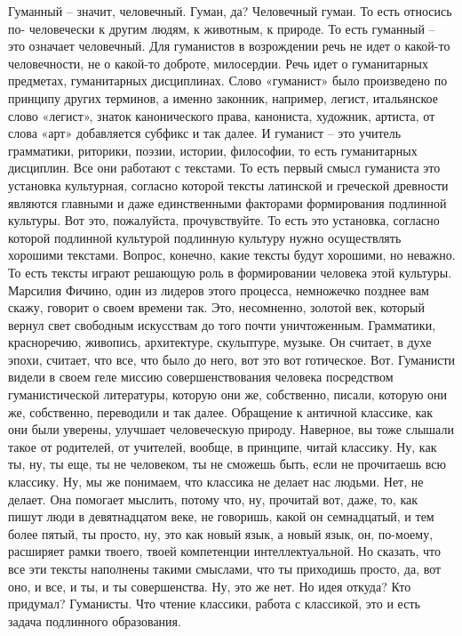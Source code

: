 Гуманный – значит, человечный. Гуман, да? Человечный гуман. То есть относись по-
человечески к другим людям, к животным, к природе. То есть гуманный – это
означает человечный. Для гуманистов в возрождении речь не идет о какой-то
человечности, не о какой-то доброте, милосердии. Речь идет о гуманитарных
предметах, гуманитарных дисциплинах. Слово «гуманист» было произведено по
принципу других терминов, а именно законник, например, легист, итальянское слово
«легист», знаток канонического права, канониста, художник, артиста, от слова
«арт» добавляется субфикс и так далее. И гуманист – это учитель грамматики,
риторики, поэзии, истории, философии, то есть гуманитарных дисциплин. Все они
работают с текстами. То есть первый смысл гуманиста это установка культурная,
согласно которой тексты латинской и греческой древности являются главными и даже
единственными факторами формирования подлинной культуры. Вот это, пожалуйста,
прочувствуйте. То есть это установка, согласно которой подлинной культурой
подлинную культуру нужно осуществлять хорошими текстами. Вопрос, конечно, какие
тексты будут хорошими, но неважно. То есть тексты играют решающую роль в
формировании человека этой культуры. Марсилия Фичино, один из лидеров этого
процесса, немножечко позднее вам скажу, говорит о своем времени так. Это,
несомненно, золотой век, который вернул свет свободным искусствам до того почти
уничтоженным. Грамматики, красноречию, живопись, архитектуре, скульптуре,
музыке. Он считает, в духе эпохи, считает, что все, что было до него, вот это
вот готическое. Вот. Гуманисти видели в своем геле миссию совершенствования
человека посредством гуманистической литературы, которую они же, собственно,
писали, которую они же, собственно, переводили и так далее. Обращение к античной
классике, как они были уверены, улучшает человеческую природу. Наверное, вы тоже
слышали такое от родителей, от учителей, вообще, в принципе, читай классику. Ну,
как ты, ну, ты еще, ты не человеком, ты не сможешь быть, если не прочитаешь всю
классику. Ну, мы же понимаем, что классика не делает нас людьми. Нет, не делает.
Она помогает мыслить, потому что, ну, прочитай вот, даже, то, как пишут люди в
девятнадцатом веке, не говоришь, какой он семнадцатый, и тем более пятый, ты
просто, ну, это как новый язык, а новый язык, он, по-моему, расширяет рамки
твоего, твоей компетенции интеллектуальной. Но сказать, что все эти тексты
наполнены такими смыслами, что ты приходишь просто, да, вот оно, и все, и ты, и
ты совершенства. Ну, это же нет. Но идея откуда? Кто придумал? Гуманисты. Что
чтение классики, работа с классикой, это и есть задача подлинного образования.

